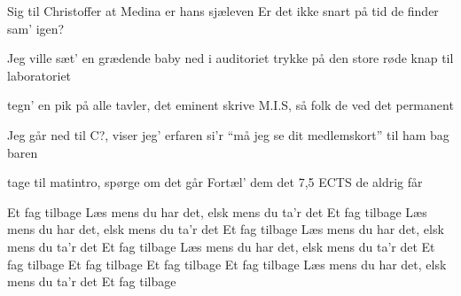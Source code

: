 \documentclass[a4paper,11pt]{article}
\begin{document}
\begin{song}
Sig til Christoffer at Medina er hans sjæleven
Er det ikke snart på tid de finder sam’ igen?

%
Jeg ville sæt’ en grædende baby ned i auditoriet
trykke på den store røde knap til laboratoriet

tegn’ en pik på alle tavler, det eminent
skrive M.I.S, så folk de ved det permanent

Jeg går ned til C?, viser jeg’ erfaren
si’r “må jeg se dit medlemskort” til ham bag baren

tage til matintro, spørge om det går
Fortæl’ dem det 7,5 ECTS de aldrig får

%
Et fag tilbage
Læs mens du har det, elsk mens du ta’r det
Et fag tilbage
Læs mens du har det, elsk mens du ta’r det
Et fag tilbage
Læs mens du har det, elsk mens du ta’r det
Et fag tilbage
Læs mens du har det, elsk mens du ta’r det
Et fag tilbage
Et fag tilbage
Et fag tilbage
Et fag tilbage
Læs mens du har det, elsk mens du ta’r det
Et fag tilbage
\end{song}
\end{document}
